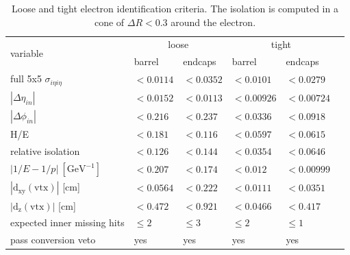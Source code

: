 \renewcommand{\arraystretch}{1.1}
\begin{table}[ht!]
\centering
\small
\caption{Loose and tight electron identification criteria. The isolation is computed in a cone of $\Delta R < 0.3$ around the electron.}
\begin{tabular}{|l|l|l||l|l|c|}
\hline
\multirow{2}{*}{variable}                             &  \multicolumn{2}{c||}{loose} &  \multicolumn{2}{c|}{tight} \\
\cline{2-5}
                                                            &  barrel        & endcaps  &  barrel  & endcaps\\
\hline
full 5x5 $\sigma_{i\eta i\eta}$                             & $< 0.0114  $     & $< 0.0352  $ & $< 0.0101  $     & $< 0.0279  $ \\
$|\Delta \eta_{in}|$                                        & $< 0.0152  $     & $< 0.0113  $ & $< 0.00926 $     & $< 0.00724 $ \\
$|\Delta \phi_{in}|$                                        & $< 0.216   $     & $< 0.237   $ & $< 0.0336  $     & $< 0.0918  $ \\
H/E                                                         & $< 0.181   $     & $< 0.116   $ & $< 0.0597  $     & $< 0.0615  $ \\
relative isolation			                    & $< 0.126   $     & $< 0.144   $ & $< 0.0354  $     & $< 0.0646  $ \\
$|1/E - 1/p|\ [\mathrm{GeV}^{-1}]$                          & $< 0.207   $     & $< 0.174   $ & $< 0.012   $     & $< 0.00999 $ \\
$|\mathrm{d_{xy}(vtx)}|$ [cm]                               & $< 0.0564  $     & $< 0.222   $ & $< 0.0111  $     & $< 0.0351  $ \\
$|\mathrm{d_{z}(vtx)}|$ [cm]                                & $< 0.472   $     & $< 0.921   $ & $< 0.0466  $     & $< 0.417   $ \\
expected inner missing hits                                 & $\leq 2$         & $\leq 3$     & $\leq 2$           & $\leq 1$   \\
pass conversion veto                                        & yes              & yes          & yes              & yes        \\
\hline
\end{tabular}
\label{tab:ElectronID}
\end{table}

